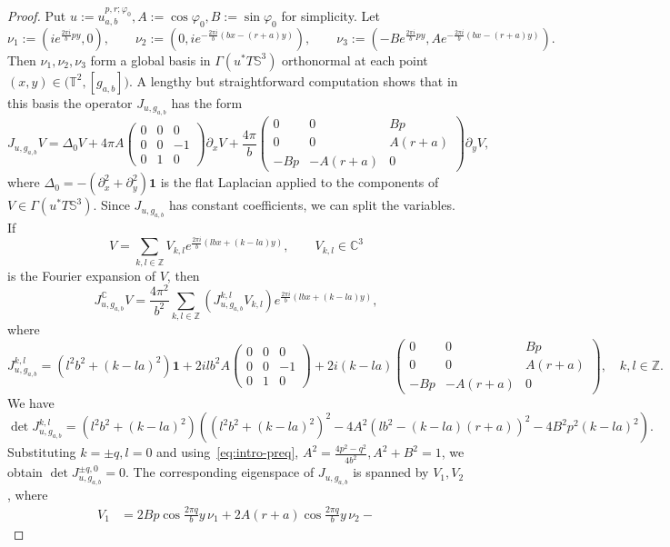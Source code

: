 \documentclass{amsart}
\let\phi\varphi
\theoremstyle{plain}
\theoremstyle{definition}
\theoremstyle{remark}
\begin{document}
\begin{proof}
Put \(u:=u_{a,b}^{p,r;\phi_0},A:=\cos\phi_0,B:=\sin\phi_0\) for simplicity. Let
\[
\nu_1:=(ie^{\frac{2\pi i}b py},0),\qquad
\nu_2:=(0,ie^{-\frac{2\pi i}b(bx-(r+a)y)}),\qquad
\nu_3:=(-Be^{\frac{2\pi i}b py},Ae^{-\frac{2\pi i}b(bx-(r+a)y)}).
\]
Then \(\nu_1,\nu_2,\nu_3\) form a global basis in \(\Gamma(u^*T\mathbb S^3)\)
orthonormal at each point \((x,y)\in\mathbb (\mathbb T^2,[g_{a,b}])\). A lengthy
but straightforward computation shows that in this basis the operator
\(J_{u,g_{a,b}}\) has the form
\[
J_{u,g_{a,b}}V=\Delta_0 V+4\pi A\begin{pmatrix}
0 & 0 & 0\\
0 & 0 & -1\\
0 & 1 & 0
\end{pmatrix}\partial_x V+\frac{4\pi}b\begin{pmatrix}
0 & 0 & Bp\\
0 & 0 & A(r+a)\\
-Bp & -A(r+a) & 0
\end{pmatrix}\partial_y V,
\]
where \(\Delta_0=-(\partial_x^2+\partial_y^2)\mathbf 1\) is the flat Laplacian
applied to the components of \(V\in\Gamma(u^*T\mathbb S^3)\). Since
\(J_{u,g_{a,b}}\) has constant coefficients, we can split the variables. If
\[
V=\sum_{k,l\in\mathbb Z}V_{k,l}e^{\frac{2\pi i}b (lbx+(k-la)y)},\qquad
V_{k,l}\in\mathbb C^3
\]
is the Fourier expansion of \(V\), then
\[
J_{u,g_{a,b}}^{\mathbb C}V=\frac{4\pi^2}{b^2}
\sum_{k,l\in\mathbb Z}(J_{u,g_{a,b}}^{k,l}V_{k,l})
e^{\frac{2\pi i}b (lbx+(k-la)y)},
\]
where
\[
J_{u,g_{a,b}}^{k,l}=(l^2 b^2+(k-la)^2)\mathbf 1+
2ilb^2 A\begin{pmatrix}
0 & 0 & 0\\
0 & 0 & -1\\
0 & 1 & 0
\end{pmatrix}+2i(k-la)\begin{pmatrix}
0 & 0 & Bp\\
0 & 0 & A(r+a)\\
-Bp & -A(r+a) & 0
\end{pmatrix},\quad k,l\in\mathbb Z.
\]
We have
\[
\det J_{u,g_{a,b}}^{k,l}=(l^2 b^2+(k-la)^2)
((l^2 b^2+(k-la)^2)^2-4A^2(lb^2-(k-la)(r+a))^2-4B^2 p^2(k-la)^2).
\]
Substituting \(k=\pm q,l=0\) and using~\eqref{eq:intro-preq},
\(A^2=\frac{4p^2-q^2}{4b^2},A^2+B^2=1\), we obtain \(\det J_{u,g_{a,b}}^{\pm
q,0}=0\). The corresponding eigenspace of \(J_{u,g_{a,b}}\) is spanned by
\(V_1,V_2\), where
\begin{align*}
V_1&=2Bp\cos\frac{2\pi q}by\,\nu_1+2A(r+a)\cos\frac{2\pi q}by\,\nu_2-

\end{align*}
\end{proof}
\end{document}

